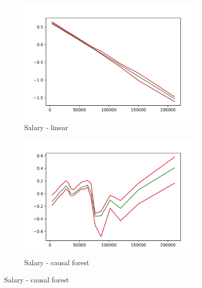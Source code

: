 \begin{figure}[h]
    \begin{subfigure}{0.5\linewidth}
        \includegraphics[width=\linewidth]{figures/ALE/chTOTexp/spec3_linear_FSALARYM.png}
        \caption{Salary - linear}
    \end{subfigure}%
    \begin{subfigure}{0.5\linewidth}
        \includegraphics[width=\linewidth]{figures/ALE/chTOTexp/spec3_cf_FSALARYM.png}
        \caption{Salary - causal forest}
    \end{subfigure}


\end{figure}
